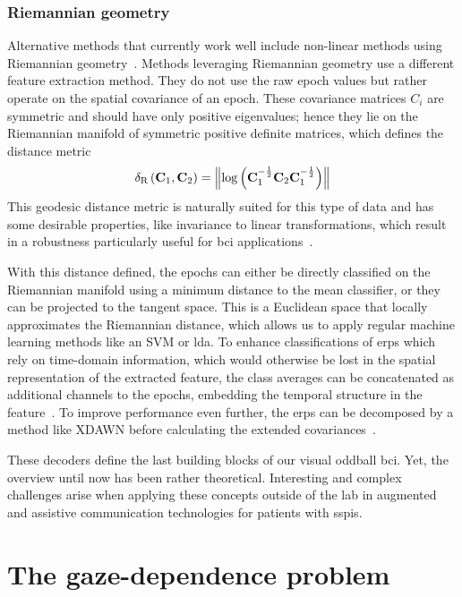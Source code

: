\subsubsection{Riemannian geometry}

Alternative methods that currently work well include non-linear methods using Riemannian
geometry~\cite{Barachant2014}.
Methods leveraging Riemannian geometry use a different feature extraction method.
They do not use the raw epoch values but rather operate on the spatial covariance of an
epoch.
These covariance matrices $C_i$ are symmetric and should have only positive eigenvalues;
hence they lie on the Riemannian manifold of symmetric positive definite matrices, which
defines the distance metric
\begin{equation}
  \delta_\text{R}\left(\mathbf{C}_1,\mathbf{C}_2\right)
  =\left\lVert\log\left(\mathbf{C}_1^{-\frac{1}{2}} \mathbf{C}_2 \mathbf{C}_1^{-\frac{1}{2}}\right)\right\rVert
\end{equation}
This geodesic distance metric is naturally suited for this type of data and has some
desirable properties, like invariance to linear transformations, which result in a
robustness particularly useful for \ac{bci} applications~\cite{Barachant2011}.

With this distance defined, the epochs can either be directly classified on the
Riemannian manifold using a minimum distance to the mean classifier, or they can be
projected to the tangent space.
This is a Euclidean space that locally approximates the Riemannian distance, which
allows us to apply regular machine learning methods like an SVM or \ac{lda}.
To enhance classifications of \acp{erp} which rely on time-domain information, which
would otherwise be lost in the spatial representation of the extracted feature, the
class averages can be concatenated as additional channels to the epochs, embedding the
temporal structure in the feature~\cite{Barachant2014}.
To improve performance even further, the \acp{erp} can be decomposed by a method like
XDAWN before calculating the extended covariances~\cite{Li2020}.

These decoders define the last building blocks of our visual oddball \ac{bci}.
Yet, the overview until now has been rather theoretical.
Interesting and complex challenges arise when applying these concepts outside of the lab
in augmented and assistive communication technologies for patients with \acp{sspi}.

\section{The gaze-dependence problem}

